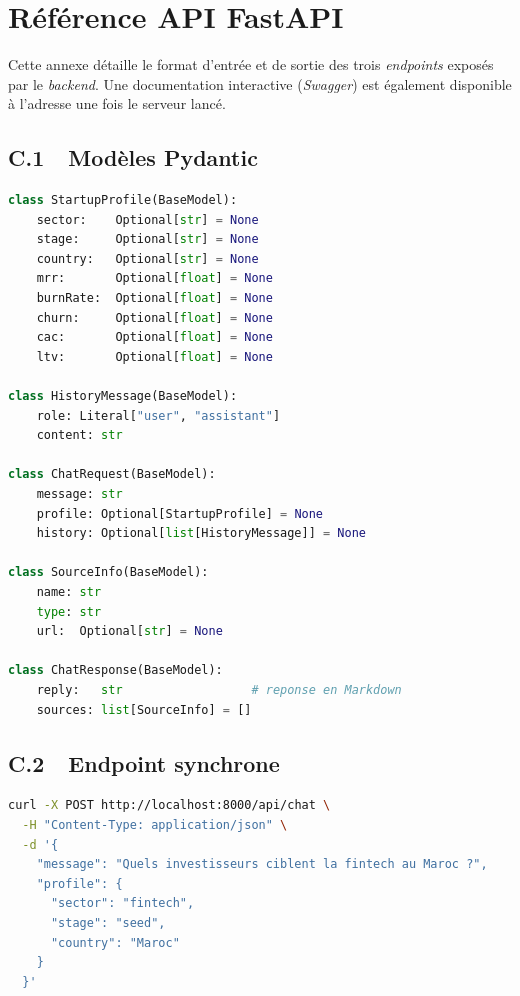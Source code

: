 \chapter{Référence API FastAPI}
\label{ann:api}

Cette annexe détaille le format d'entrée et de sortie des trois \textit{endpoints} exposés par le \textit{backend}. Une documentation interactive (\textit{Swagger}) est également disponible à l'adresse  une fois le serveur lancé.

\section*{C.1~~Modèles Pydantic}

\begin{lstlisting}[language=Python, caption={Modèles Pydantic d'entrée/sortie (extrait simplifié).}]
class StartupProfile(BaseModel):
    sector:    Optional[str] = None
    stage:     Optional[str] = None
    country:   Optional[str] = None
    mrr:       Optional[float] = None
    burnRate:  Optional[float] = None
    churn:     Optional[float] = None
    cac:       Optional[float] = None
    ltv:       Optional[float] = None

class HistoryMessage(BaseModel):
    role: Literal["user", "assistant"]
    content: str

class ChatRequest(BaseModel):
    message: str
    profile: Optional[StartupProfile] = None
    history: Optional[list[HistoryMessage]] = None

class SourceInfo(BaseModel):
    name: str
    type: str
    url:  Optional[str] = None

class ChatResponse(BaseModel):
    reply:   str                  # reponse en Markdown
    sources: list[SourceInfo] = []
\end{lstlisting}

\section*{C.2~~Endpoint synchrone }

\begin{lstlisting}[language=bash, caption={Exemple d'appel \code{curl} à \code{/api/chat}.}]
curl -X POST http://localhost:8000/api/chat \
  -H "Content-Type: application/json" \
  -d '{
    "message": "Quels investisseurs ciblent la fintech au Maroc ?",
    "profile": {
      "sector": "fintech",
      "stage": "seed",
      "country": "Maroc"
    }
  }'
\end{lstlisting}

